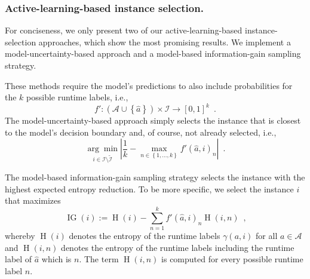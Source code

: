 \documentclass[runningheads]{llncs}
\begin{document}
\subsubsection{Active-learning-based instance selection.}
\label{sec:sampling2}
For conciseness, we only present two of our active-learning-based instance-selection approaches, which show the most promising results.
We implement a model-uncertainty-based approach and a model-based information-gain sampling strategy.

These methods require the model's predictions to also include probabilities for the $k$ possible runtime labels, i.e., 
\begin{equation}
  f'\!: \left(\mathcal{A} \cup \left\lbrace \hat{a} \right\rbrace\right) \times \mathcal{I} \rightarrow \left[0, 1\right]^k  \enspace \textrm{.}
\end{equation}
The model-uncertainty-based approach simply selects the instance that is closest to the model's decision boundary and, of course, not already selected, i.e.,
\begin{equation}
  \underset{i \in \mathcal{I} \setminus \tilde{\mathcal{I}}}{\arg\min} \left\lvert \frac{1}{k} - \max_{n \in \left\lbrace 1, \dots, k \right\rbrace} f'\!\left(\hat{a}, i\right)_{n} \right\rvert \enspace \textrm{.}
\end{equation}

The model-based information-gain sampling strategy selects the instance with the highest expected entropy reduction.
To be more specific, we select the instance $i$ that maximizes
\begin{equation}
  \operatorname{IG}\!\left(i\right) := \operatorname{H}\!\left(i\right) - \sum_{n = 1}^{k} f'\!\left(\hat{a}, i\right)_{n} \operatorname{H}\!\left(i, n\right) \enspace \textrm{,}
\end{equation}
whereby $\operatorname{H}\!\left(i\right)$ denotes the entropy of the runtime labels $\gamma\!\left(a, i\right)$ for all $a \in \mathcal{A}$ and $\operatorname{H}\!\left(i, n\right)$ denotes the entropy of the runtime labels including the runtime label of $\hat{a}$ which is $n$.
The term $\operatorname{H}\!\left(i, n\right)$ is computed for every possible runtime label $n$.
\end{document}
